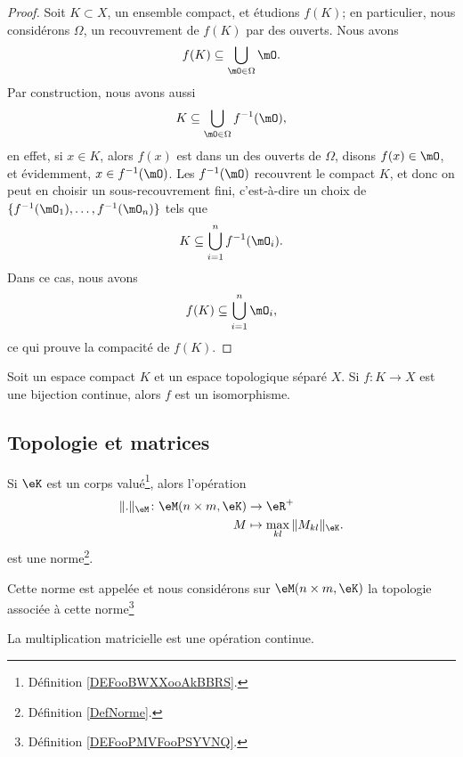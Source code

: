 \begin{proof}
	Soit \( K\subset X\), un ensemble compact, et étudions \( f(K)\); en particulier, nous considérons \( \Omega\), un recouvrement de \( f(K)\) par des ouverts. Nous avons
	\begin{equation}
		f(K)\subseteq\bigcup_{\mO\in\Omega}\mO.
	\end{equation}
	Par construction, nous avons aussi
	\begin{equation}
		K\subseteq\bigcup_{\mO\in\Omega}f^{-1}(\mO),
	\end{equation}
	en effet, si \( x\in K\), alors \( f(x)\) est dans un des ouverts de \( \Omega\), disons \( f(x)\in \mO\), et évidemment, \( x\in f^{-1}(\mO)\).  Les \( f^{-1}(\mO)\) recouvrent le compact \( K\), et donc on peut en choisir un sous-recouvrement fini, c'est-à-dire un choix de \( \{ f^{-1}(\mO_1),\ldots,f^{-1}(\mO_n) \}\) tels que
	\begin{equation}
		K\subseteq \bigcup_{i=1}^nf^{-1}(\mO_i).
	\end{equation}
	Dans ce cas, nous avons
	\begin{equation}
		f(K)\subseteq\bigcup_{i=1}^n\mO_i,
	\end{equation}
	ce qui prouve la compacité de \( f(K)\).
\end{proof}

\begin{lemma}       \label{LEMooNEEVooSeHYzx}
    Soit un espace compact \( K\) et un espace topologique séparé \( X\). Si \( f\colon K\to X\) est une bijection continue, alors \( f\) est un isomorphisme.
\end{lemma}

\subsection{Topologie et matrices}

\begin{lemmaDef}      \label{DEFooCQHDooYpUAhG}
	Si \( \eK\) est un corps valué\footnote{Définition \ref{DEFooBWXXooAkBBRS}.}, alors l'opération
	\begin{equation}
		\begin{aligned}
			\| . \|_{\eM}\colon \eM(n\times m,\eK) & \to \eR^+                             \\
			M                                      & \mapsto  \max_{kl}\| M_{kl} \|_{\eK}.
		\end{aligned}
	\end{equation}
	est une norme\footnote{Définition \ref{DefNorme}.}.

	Cette norme est appelée  et nous considérons sur \( \eM(n\times m, \eK)\) la topologie associée à cette norme\footnote{Définition \ref{DEFooPMVFooPSYVNQ}.}
\end{lemmaDef}

\begin{proposition}     \label{PROPooOEETooPhqWuf}
	La multiplication matricielle est une opération continue.
\end{proposition}
